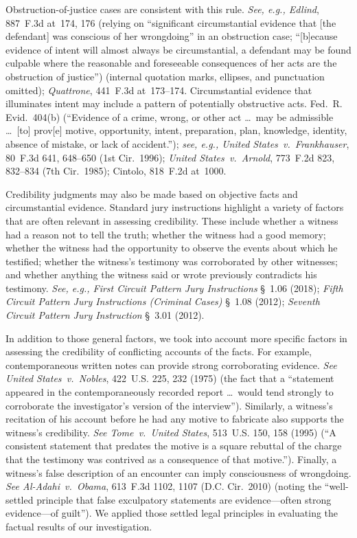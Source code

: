 Obstruction-of-justice cases are consistent with this rule.
\textit{See, e.g., Edlind}, 887~F.3d at~174, 176 (relying on ``significant circumstantial evidence that [the defendant] was conscious of her wrongdoing'' in an obstruction case; ``[b]ecause evidence of intent will almost always be circumstantial, a defendant may be found culpable where the reasonable and foreseeable consequences of her acts are the obstruction of justice'') (internal quotation marks, ellipses, and punctuation omitted);
\textit{Quattrone}, 441~F.3d at~173--174.
Circumstantial evidence that illuminates intent may include a pattern of potentially obstructive acts. Fed.~R. Evid.~404(b) (``Evidence of a crime, wrong, or other act \dots\ may be admissible \dots\ [to] prov[e] motive, opportunity, intent, preparation, plan, knowledge, identity, absence of mistake, or lack of accident.'');
\textit{see, e.g., United States~v.\ Frankhauser}, 80~F.3d 641, 648--650 (1st Cir.~1996);
\textit{United States~v.\ Arnold}, 773~F.2d 823, 832--834 (7th Cir.~1985);
Cintolo, 818~F.2d at~1000.

Credibility judgments may also be made based on objective facts and circumstantial evidence.
Standard jury instructions highlight a variety of factors that are often relevant in assessing credibility.
These include whether a witness had a reason not to tell the truth; whether the witness had a good memory;
whether the witness had the opportunity to observe the events about which he testified;
whether the witness's testimony was corroborated by other witnesses;
and whether anything the witness said or wrote previously contradicts his testimony.
\textit{See, e.g., First Circuit Pattern Jury Instructions} \S~1.06 (2018);
\textit{Fifth Circuit Pattern Jury Instructions (Criminal Cases)} \S~1.08 (2012);
\textit{Seventh Circuit Pattern Jury Instruction} \S~3.01 (2012).

In addition to those general factors, we took into account more specific factors in assessing the credibility of conflicting accounts of the facts.
For example, contemporaneous written notes can provide strong corroborating evidence.
\textit{See United States~v.\ Nobles}, 422~U.S. 225, 232 (1975) (the fact that a ``statement appeared in the contemporaneously recorded report \dots\ would tend strongly to corroborate the investigator's version of the interview'').
Similarly, a witness's recitation of his account before he had any motive to fabricate also supports the witness's credibility.
\textit{See Tome~v.\ United States}, 513~U.S. 150, 158 (1995) (``A consistent statement that predates the motive is a square rebuttal of the charge that the testimony was contrived as a consequence of that motive.'').
Finally, a witness's false description of an encounter can imply consciousness of wrongdoing.
\textit{See Al-Adahi~v.\ Obama}, 613~F.3d 1102, 1107 (D.C. Cir.~2010) (noting the ``well-settled principle that false exculpatory statements are evidence---often strong evidence---of guilt'').
We applied those settled legal principles in evaluating the factual results of our investigation.
